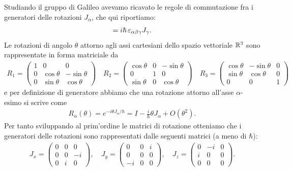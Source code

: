 Studiando il gruppo di Galileo avevamo ricavato le regole di commutazione fra i generatori delle rotazioni $ J_\alpha $, che qui riportiamo:
\begin{align*}
  [J_\alpha, J_\beta] = i\hbar \,\eps_{\alpha \beta \gamma} J_\gamma.
\end{align*}
Le rotazioni di angolo $ \theta $ attorno agli assi cartesiani dello spazio vettoriale $ \mathbb{R}^3 $ sono rappresentate in forma matriciale da
\begin{align*}
  R_1=
  \begin{pmatrix}
    1 & 0 & 0 \\
    0 & \cos \theta & -\sin \theta \\
    0 & \sin \theta & \cos \theta
  \end{pmatrix}
  \quad
  R_2=
  \begin{pmatrix}
    \cos \theta & 0 & -\sin \theta \\
    0 & 1 & 0 \\
    \sin \theta & 0 & \cos \theta
  \end{pmatrix}
  \quad
  R_3=
  \begin{pmatrix}
    \cos \theta & -\sin \theta & 0 \\
    \sin \theta & \cos \theta & 0 \\
    0 & 0 & 1 
  \end{pmatrix}
\end{align*}
e per definizione di generatore abbiamo che una rotazione attorno all'asse $ \alpha $-esimo si scrive come 
\begin{align*}
  R_\alpha(\theta) = e^{- i \theta J_\alpha /\hbar} = I - \frac{i}\hbar \theta J_\alpha + O(\theta^2).
\end{align*}
Per tanto sviluppando al prim'ordine le matrici di rotazione otteniamo che i generatori delle rotazioni sono rappresentati dalle seguenti matrici
(a meno di $ \hbar $):
\begin{align*}
  J_x = 
  \begin{pmatrix}
    0 & 0 & 0 \\
    0 & 0 & -i \\
    0 & i & 0 
  \end{pmatrix},
  \quad
  J_y = 
  \begin{pmatrix}
    0 & 0 & i \\
    0 & 0 & 0 \\
    -i & 0 & 0 
  \end{pmatrix},
  \quad
  J_z = 
  \begin{pmatrix}
    0 & -i & 0 \\
    i & 0 & 0 \\
    0 & 0 & 0 
  \end{pmatrix}.
\end{align*}
